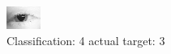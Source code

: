 \begin{figure}[h!]
\begin{center}
\includegraphics[width=0.60\columnwidth]{figures/ID122_class_4_target_3.png}
\end{center}
\caption{ Classification: 4 actual target: 3}
\label{fig:ID122_class_4_target_3}
\end{figure}
